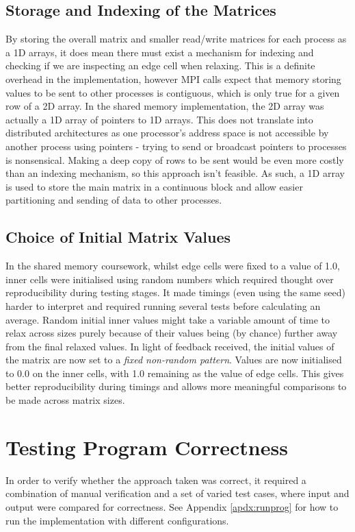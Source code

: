 \documentclass[11pt]{article}
\begin{document}
{\color{darkindigo}
\subsection*{Storage and Indexing of the Matrices}}
By storing the overall matrix and smaller read/write matrices for each process as a 1D arrays, it does mean there must exist a mechanism for indexing and checking if we are inspecting an edge cell when relaxing. This is a definite overhead in the implementation, however  MPI calls expect that memory storing values to be sent to other processes is contiguous, which is only true for a given row of a 2D array. In the shared memory implementation, the 2D array was actually a 1D array of pointers to 1D arrays. This does not translate into distributed architectures as one processor's address space is not accessible by another process using pointers - trying to send or broadcast pointers to processes is nonsensical. Making a deep copy of rows to be sent would be even more costly than an indexing mechanism, so this approach isn't feasible. As such, a 1D array is used to store the main matrix in a continuous block and allow easier partitioning and sending of data to other processes.

{\color{darkindigo}
\subsection*{Choice of Initial Matrix Values}}
In the shared memory coursework, whilst edge cells were fixed to a value of 1.0, inner cells were initialised using random numbers which required thought over reproducibility during testing stages. It made timings (even using the same seed) harder to interpret and required running several tests before calculating an average. Random initial inner values might take a variable amount of time to relax across sizes purely because of their values being (by chance) further away from the final relaxed values. In light of feedback received, the initial values of the matrix are now set to a \textit{fixed non-random pattern}.  Values are now initialised to 0.0 on the inner cells, with 1.0 remaining as the value of edge cells. This gives better reproducibility during timings and allows more meaningful comparisons to be made across matrix sizes. 

{\color{indigo}
\section{Testing Program Correctness}}
In order to verify whether the approach taken was correct, it required a combination of manual verification and a set of varied test cases, where input and output were compared for correctness. See Appendix \ref{apdx:runprog} for how to run the implementation with different configurations.
\end{document}
